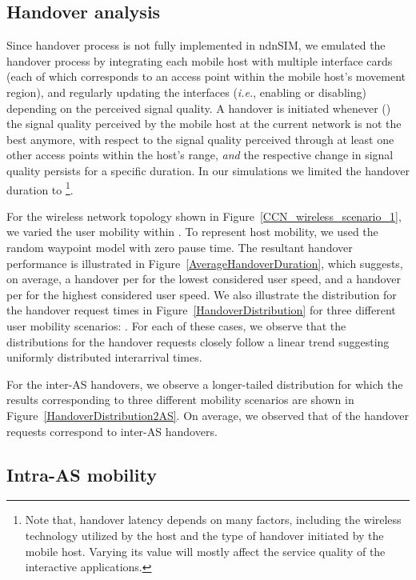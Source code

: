 \documentclass[conference]{IEEEtran}
\begin{document}
\subsection{Handover analysis}

Since handover process is not fully implemented in ndnSIM, we emulated the handover process by integrating each mobile host with multiple interface cards (each of which corresponds to an access point within the mobile host's movement region), and regularly updating the interfaces (\emph{i.e.}, enabling or disabling) depending on the perceived signal quality. A handover is initiated whenever () the signal quality perceived by the mobile host at the current network is not the best anymore, with respect to the signal quality perceived through at least one other access points within the host's range, {\emph{and}}  the respective change in signal quality persists for a specific duration. In our simulations we limited the handover duration to \footnote{Note that, handover latency depends on many factors, including the wireless technology utilized by the host and the type of handover initiated by the mobile host. Varying its value will mostly affect the service quality of the interactive applications.}.


For the wireless network topology shown in Figure~\ref{CCN_wireless_scenario_1}, we varied the user mobility within .  To represent host mobility, we used the random waypoint model with zero pause time. The resultant handover performance is illustrated in Figure~\ref{AverageHandoverDuration}, which suggests, on average, a handover per  for the lowest considered user speed, and a handover per  for the highest considered user speed. We also illustrate the distribution for the handover request times in Figure~\ref{HandoverDistribution} for three different user mobility scenarios: . For each of these cases, we observe that the distributions for the handover requests closely follow a linear trend suggesting uniformly distributed interarrival times.


For the inter-AS handovers, we observe a longer-tailed distribution for which the results corresponding to three different mobility scenarios are shown in Figure~\ref{HandoverDistribution2AS}. On average, we observed that  of the handover requests correspond to inter-AS handovers.


\subsection{Intra-AS mobility}
\end{document}
